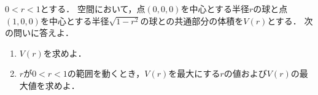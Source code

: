 \documentclass[../../main.tex]{subfiles}
\begin{document}
$0<r<1$とする．
空間において，点$(0,0,0)$を中心とする半径$r$の球と点$(1,0,0)$を中心とする半径$\sqrt{1-r^2}$の球との共通部分の体積を$V(r)$とする．
次の問いに答えよ．
\begin{enumerate}
  \item $V(r)$を求めよ．
  \item $r$が$0<r<1$の範囲を動くとき，$V(r)$を最大にする$r$の値および$V(r)$の最大値を求めよ．
\end{enumerate}
\end{document}
